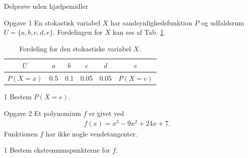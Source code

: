 \documentclass[12pt,x11names,a4paper]{article}
\begin{document}
\begin{center}
\LARGE
Delprøve uden hjælpemidler 
\end{center}
\begin{opgavetekst}{Opgave 1}
	En stokastisk variabel $X$ har sandsynlighedsfunktion $P$ og udfaldsrum  \\
	$U = \{a,b,c,d,e\}$. Fordelingen for $X$ 
	kan ses af Tab. \ref{tab:fordeling}.
	\begin{table}[H]
		\centering
		\begin{tabular}{c|c|c|c|c|c}
			$U$ & $a$ & $b$ &  $c$ & $d$ & $e$ \\
			\hline
			$P(X=x)$ & 0.5 & 0.1 & 0.05 & 0.05 & $P(X=e)$
		\end{tabular}
		\caption{Fordeling for den stokastiske variabel $X$. }
		\label{tab:fordeling}		
	\end{table}
	\phantom{h}
\end{opgavetekst}
	\begin{delopgave}{}{1}
		Bestem $P(X=e)$.
	\end{delopgave}

\begin{opgavetekst}{Opgave 2}
	Et polynomium $f$ er givet ved
	\begin{align*}
		f(x) = x^3-9x^2+24x+7.
	\end{align*}
	Funktionen $f$ har ikke nogle vendetangenter.
\end{opgavetekst}
\begin{delopgave}{}{1}
	Bestem ekstremumspunkterne for $f$. 
\end{delopgave}
\end{document}
